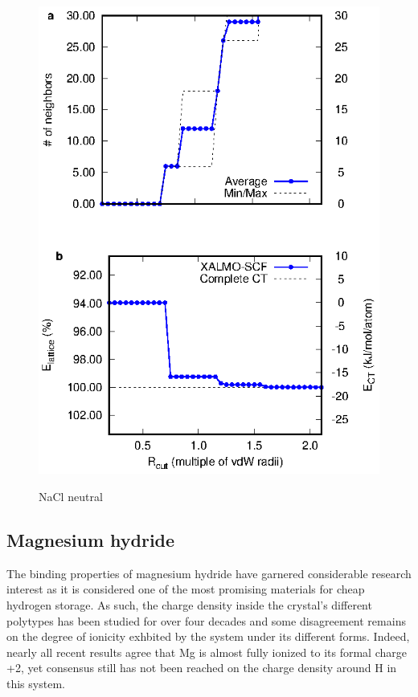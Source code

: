 \documentclass[aps,prb,twocolumn,amsmath,amssymb,superscriptaddress,longbibliography]{revtex4-1}
\begin{document}
\begin{figure}
\includegraphics[scale=1]{./plots/NaCl_EvRneutral}
\label{nacln}
\caption{NaCl neutral}
\end{figure}

%




\subsection*{Magnesium hydride}

The binding properties of magnesium hydride have garnered considerable research interest as it is considered one of the most promising materials for cheap hydrogen storage\cite{Hstorage}.  
As such, the charge density inside the crystal's different polytypes has been studied for over four decades\cite{oldmgh2} and some disagreement remains on the degree of ionicity exhbited by the system under its different forms.  
Indeed, nearly all recent results agree that Mg is almost fully ionized to its formal charge +2, yet consensus still has not been reached on the charge density around H in this system\cite{[conflicting DFT/exp sources]}.
\end{document}
